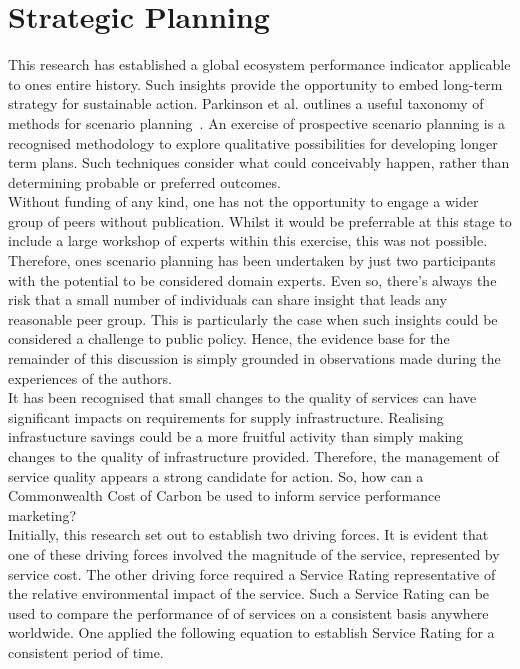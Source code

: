 \documentclass[11pt, oneside]{article}   	%
\begin{document}
\section{Strategic Planning}
This research has established a global ecosystem performance indicator applicable to ones entire history.
Such insights provide the opportunity to embed long-term strategy for sustainable action.
Parkinson et al. outlines a useful taxonomy of methods for scenario planning~\cite{atp1}.
An exercise of prospective scenario planning is a recognised methodology to explore qualitative possibilities for developing longer term plans.
Such techniques consider what could conceivably happen, rather than determining probable or preferred outcomes.\\

Without funding of any kind, one has not the opportunity to engage a wider group of peers without publication.
Whilst it would be preferrable at this stage to include a large workshop of experts within this exercise, this was not possible.
Therefore, ones scenario planning has been undertaken by just two participants with the potential to be considered domain experts.
Even so, there's always the risk that a small number of individuals can share insight that leads any reasonable peer group.
This is particularly the case when such insights could be considered a challenge to public policy.
Hence, the evidence base for the remainder of this discussion is simply grounded in observations made during the experiences of the authors.\\

It has been recognised that small changes to the quality of services can have significant impacts on requirements for supply infrastructure.
Realising infrastucture savings could be a more fruitful activity than simply making changes to the quality of infrastructure provided.
Therefore, the management of service quality appears a strong candidate for action.
So, how can a Commonwealth Cost of Carbon be used to inform service performance marketing?\\

Initially, this research set out to establish two driving forces.
It is evident that one of these driving forces involved the magnitude of the service, represented by service cost.
The other driving force required a Service Rating representative of the relative environmental impact of the service.
Such a Service Rating can be used to compare the performance of of services on a consistent basis anywhere worldwide.
One applied the following equation to establish Service Rating for a consistent period of time.\\
\end{document}
